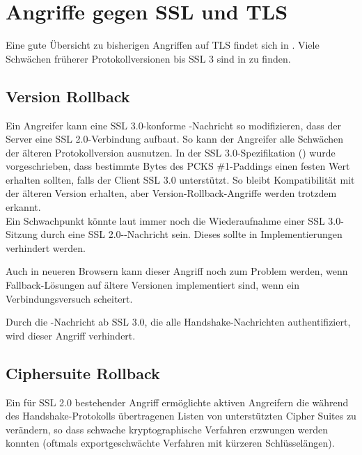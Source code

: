 
\chapter{Angriffe gegen SSL und TLS}

\label{cha_attacks}

Eine gute Übersicht zu bisherigen Angriffen auf TLS findet sich in \cite{meyer13}. Viele Schwächen früherer Protokollversionen bis SSL 3 sind in \cite{wagner96} zu finden.

\section{Version Rollback}

\label{sec_version_rollback}

Ein Angreifer kann eine SSL 3.0-konforme \clienthello{}-Nachricht so modifizieren, dass der Server eine SSL 2.0-Verbindung aufbaut. So kann der Angreifer alle Schwächen der älteren Protokollversion ausnutzen. In der SSL 3.0-Spezifikation (\cite{ssl30}) wurde vorgeschrieben, dass bestimmte Bytes des PCKS \#1-Paddings einen festen Wert erhalten sollten, falls der Client SSL 3.0 unterstützt. So bleibt Kompatibilität mit der älteren Version erhalten, aber Version-Rollback-Angriffe werden trotzdem erkannt.\\
Ein Schwachpunkt könnte laut \cite{wagner96} immer noch die Wiederaufnahme einer SSL 3.0-Sitzung durch eine SSL 2.0-\clienthello{}-Nachricht sein. Dieses sollte in Implementierungen verhindert werden.

Auch in neueren Browsern kann dieser Angriff noch zum Problem werden, wenn Fallback-Lösungen auf ältere Versionen implementiert sind, wenn ein Verbindungsversuch scheitert.

Durch die \finished{}-Nachricht ab SSL 3.0, die alle Handshake-Nachrichten authentifiziert, wird dieser Angriff verhindert. 

\section{Ciphersuite Rollback}

Ein für SSL 2.0 bestehender Angriff ermöglichte aktiven Angreifern die während des Handshake-Protokolls übertragenen Listen von unterstützten Cipher Suites zu verändern, so dass schwache kryptographische Verfahren erzwungen werden konnten (oftmals exportgeschwächte Verfahren mit kürzeren Schlüsselängen).

